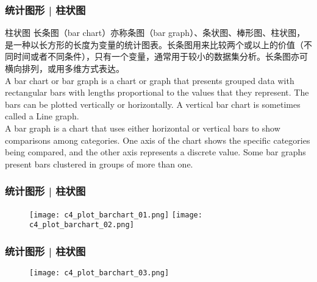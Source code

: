 \begin{frame}
  \frametitle{统计图形 | 柱状图}
  \begin{block}{柱状图}
    长条图（bar chart）亦称条图（bar graph）、条状图、棒形图、柱状图，是一种以长方形的长度为变量的统计图表。长条图用来比较两个或以上的价值（不同时间或者不同条件），只有一个变量，通常用于较小的数据集分析。长条图亦可横向排列，或用多维方式表达。\\
\vspace{0.5em}
A bar chart or bar graph is a chart or graph that presents grouped data with rectangular bars with lengths proportional to the values that they represent. The bars can be plotted vertically or horizontally. A vertical bar chart is sometimes called a Line graph.\\
\vspace{0.5em}
A bar graph is a chart that uses either horizontal or vertical bars to show comparisons among categories. One axis of the chart shows the specific categories being compared, and the other axis represents a discrete value. Some bar graphs present bars clustered in groups of more than one.
  \end{block}
\end{frame}

\begin{frame}
  \frametitle{统计图形 | 柱状图}
  \begin{figure}
    \centering
    \texttt{[image: c4\_plot\_barchart\_01.png]}
    \texttt{[image: c4\_plot\_barchart\_02.png]}
  \end{figure}
\end{frame}

\begin{frame}
  \frametitle{统计图形 | 柱状图}
  \begin{figure}
    \centering
    \texttt{[image: c4\_plot\_barchart\_03.png]}
  \end{figure}
\end{frame}

